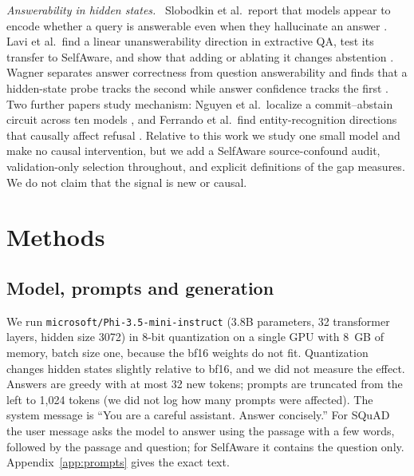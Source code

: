 \documentclass[10pt]{article}
\renewcommand{\paragraph}[1]{\par\vspace{0.3em}\noindent\textit{#1}\ }
\newcommand{\code}[1]{\texttt{#1}}
\begin{document}
\paragraph{Answerability in hidden states.}
Slobodkin et al.\ report that models appear to encode whether a query is answerable even when they hallucinate an answer \citep{slobodkin2023curious}. Lavi et al.\ find a linear unanswerability direction in extractive QA, test its transfer to SelfAware, and show that adding or ablating it changes abstention \citep{lavi2026directions}. Wagner separates answer correctness from question answerability and finds that a hidden-state probe tracks the second while answer confidence tracks the first \citep{wagner2026twoaxes}. Two further papers study mechanism: Nguyen et al.\ localize a commit--abstain circuit across ten models \citep{nguyen2026cac}, and Ferrando et al.\ find entity-recognition directions that causally affect refusal \citep{ferrando2025entity}. Relative to this work we study one small model and make no causal intervention, but we add a SelfAware source-confound audit, validation-only selection throughout, and explicit definitions of the gap measures. We do not claim that the signal is new or causal.

\section{Methods}
\subsection{Model, prompts and generation}
We run \code{microsoft/Phi-3.5-mini-instruct} (3.8B parameters, 32 transformer layers, hidden size 3072) in 8-bit quantization on a single GPU with 8~GB of memory, batch size one, because the bf16 weights do not fit. Quantization changes hidden states slightly relative to bf16, and we did not measure the effect. Answers are greedy with at most 32 new tokens; prompts are truncated from the left to 1,024 tokens (we did not log how many prompts were affected). The system message is ``You are a careful assistant. Answer concisely.'' For SQuAD the user message asks the model to answer using the passage with a few words, followed by the passage and question; for SelfAware it contains the question only. Appendix~\ref{app:prompts} gives the exact text.
\end{document}
